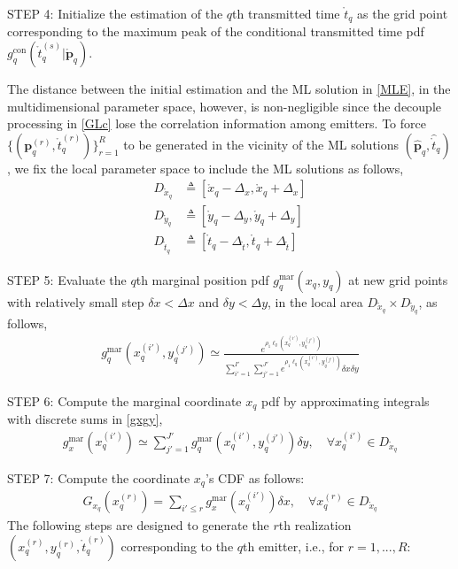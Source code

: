 \documentclass[review]{elsarticle}
\begin{document}
STEP 4: Initialize the estimation of the $q$th transmitted time $\mathring{t}_q$ as the grid point corresponding to the maximum peak of the conditional transmitted time pdf $g_{q}^{\text{con}}(\mathring{t}_q^{(s)} \vert \mathring{\boldsymbol{p}}_q)$.

The distance between the initial estimation and the ML solution in \eqref{MLE}, in the multidimensional parameter space, however, is non-negligible since the decouple processing in \eqref{GLc} lose the correlation information among emitters. To force $\lbrace(\boldsymbol{p}_q^{(r)},\mathring{t}_q^{(r)})\rbrace_{r=1}^{R}$ to be generated in the vicinity of the ML solutions $(\hat{\boldsymbol{p}}_q,\hat{\mathring{t}}_q)$, we fix the local parameter space to include the ML solutions as follows,
\begin{align}
    D_{\mathring{x}_q}&\triangleq[\mathring{x}_q-\Delta_x,\mathring{x}_q+\Delta_x]\\
    D_{\mathring{y}_q}&\triangleq[\mathring{y}_q-\Delta_y,\mathring{y}_q+\Delta_y]\\
    D_{\mathring{t}_q}&\triangleq[\mathring{t}_q-\Delta_{\mathring{t}},\mathring{t}_q+\Delta_{\mathring{t}}]
\end{align}

STEP 5: Evaluate the $q$th marginal position pdf $g_{q}^{\text{mar}}(x_q,y_q)$ at new grid points with relatively small step $\delta x<\Delta x$ and $\delta y<\Delta y$, in the local area $D_{\mathring{x}_q}\times D_{\mathring{y}_q}$, as follows,
\begin{align}\label{step5}
    g_{q}^{\text{mar}}(x_q^{(i')},y_q^{(j')})\simeq\frac{e^{\rho_1\ell_q (x_q^{(i')},y_q^{(j')})}}{\sum_{i'=1}^{I'}\sum_{j'=1}^{J'}e^{\rho_1\ell_q (x_q^{(i')},y_q^{(j')})}\delta x\delta y}
\end{align}

STEP 6: Compute the marginal coordinate $x_q$ pdf by approximating integrals with discrete sums in \eqref{gxgy},
\begin{align}
    g_{x}^{\text{mar}}(x_q^{(i')})\simeq \sum_{j'=1}^{J'} g_{q}^{\text{mar}}(x_q^{(i')},y_q^{(j')})\delta y, \quad \forall x_q^{(i')}\in D_{\mathring{x}_q}
\end{align}

STEP 7: Compute the coordinate $x_q$'s CDF as follows:
\begin{align}\label{Gxq}
    G_{x_q}(x_q^{(r)})=\sum_{i'\leq r} g_{x}^{\text{mar}}(x_q^{(i')})\delta x, \quad \forall x_q^{(r)}\in D_{\mathring{x}_q} 
\end{align}
The following steps are designed to generate the $r$th realization $(x_q^{(r)},y_q^{(r)},\mathring{t}_q^{(r)})$ corresponding to the $q$th emitter, i.e., for $r=1,...,R$:
\end{document}
